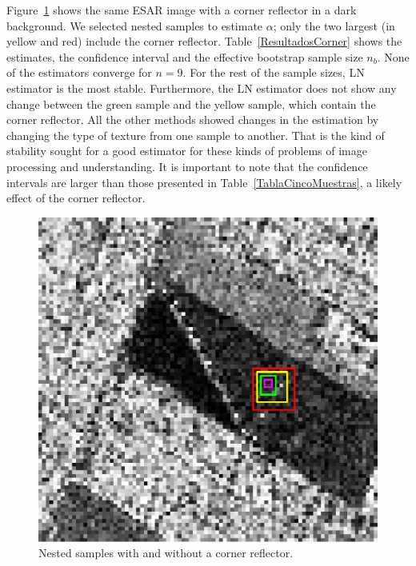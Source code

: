 \documentclass[twocolumn]{svjour3}
\begin{document}
Figure~\ref{CornerReflector} shows the same ESAR image with a corner reflector in a dark background. 
We selected nested samples to estimate $\alpha$; only the two largest (in yellow and red) include the corner reflector.
Table~\ref{ResultadosCorner} shows the estimates, the confidence interval and the effective bootstrap sample size $n_b$.
None of the estimators converge for $n=9$. 
For the rest of the sample sizes, LN estimator is the most stable. 
Furthermore, the LN estimator does not show any change between the green sample and the yellow sample, which contain the corner reflector. 
All the other methods showed changes in the estimation by changing the type of texture from one sample to another. 
That is the kind of stability sought for a good estimator for these kinds of problems of image processing and understanding. 
It is important to note that the confidence intervals are larger than those presented in Table~\ref{TablaCincoMuestras}, a likely effect of the corner reflector.

\begin{figure}[hbt]
	\centering
	\includegraphics[width=\linewidth]{../../../Figures/PaperTesis/CornerJulia_Roja.eps}
	\caption{Nested samples with and without a corner reflector.}\label{CornerReflector}
\end{figure}
\end{document}
